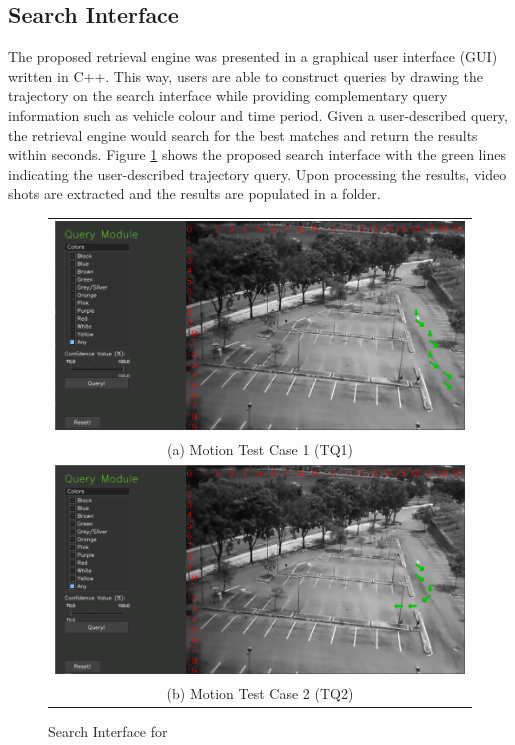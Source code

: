 \vspace{1em}
\subsection{Search Interface}

The proposed retrieval engine was presented in a graphical user interface (GUI) written in C++. This way, users are able to construct queries by drawing the trajectory on the search interface while providing complementary query information such as vehicle colour and time period. Given a user-described query, the retrieval engine would search for the best matches and return the results within seconds. Figure \ref{fig:versionOneInterface} shows the proposed search interface with the green lines indicating the user-described trajectory query. Upon processing the results, video shots are extracted and the results are populated in a folder.
\begin{figure}[!tb]
	\centering
	\begin{tabular}{c}
		\includegraphics[width=0.7\linewidth]{image/retrievalOne/test1-8inputs.PNG} \\
		(a) Motion Test Case 1 (TQ1) \\
		\includegraphics[width=0.7\linewidth]{image/retrievalOne/test2-6input.PNG}\\
		(b) Motion Test Case 2 (TQ2)
	\end{tabular}
	\caption{Search Interface for \versionOneRet}
	\label{fig:versionOneInterface}
\end{figure}

